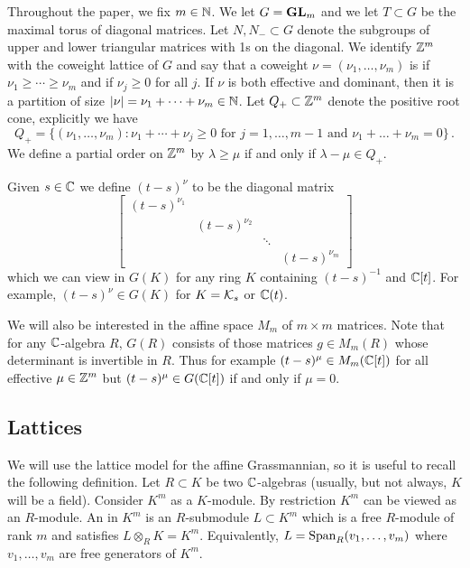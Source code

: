 \documentclass{article}
\begin{document}
Throughout the paper, we fix \( m \in \mathbb N\).  We let \(G = {\mathbf{GL}}_m\) and we let \(T\subset G\) be the maximal torus of diagonal matrices. Let \( N, N_- \subset G\) denote the subgroups of upper and lower triangular matrices with 1s on the diagonal. 
We identify \(\mathbb Z^m\) with the coweight lattice of \(G\) and say that a coweight \(\nu = (\nu_1,\dots,\nu_m)\) is  if \(\nu_1\ge\cdots\ge\nu_m\) and  if \(\nu_j\ge 0\) for all \(j\).
% 
If \(\nu\) is both effective and dominant, then it is a partition of size \(|\nu| = \nu_1 + \cdots + \nu_m\in\mathbb N\).  Let \( Q_+ \subset \mathbb Z^m\) denote the positive root cone, explicitly we have
\[
    Q_+ = \{ (\nu_1, \dots, \nu_m) : \nu_1 + \cdots + \nu_j \ge 0 \text{ for }j = 1, \dots, m-1 \text{ and } \nu_1 + \dots + \nu_m = 0 \} \,. 
\]
We define a partial order on \( \mathbb Z^m\) by \( \lambda \ge \mu \) if and only if \( \lambda - \mu \in Q_+ \).

Given \(s\in\mathbb C\) we define \((t-s)^\nu\) to be the diagonal matrix 
\[
\begin{bmatrix}
    (t-s)^{\nu_1} \\
    & (t-s)^{\nu_2} \\ 
    & & \ddots \\
    & & & (t-s)^{\nu_m}
\end{bmatrix} 
\]
which we can view in \(G(K)\) for any ring \( K \) containing \((t-s)^{-1}\) and \(\mathbb C[t]\). For example, \((t-s)^\nu\in G(K)\) for \( K = \mathcal K_s\) or \(\mathbb C(t)\).

We will also be interested in the affine space \( M_m\) of \(m\times m\) matrices.  Note that for any \( \mathbb C\)-algebra \( R \), \(G(R)\) consists of those matrices \( g \in M_m(R) \) whose determinant is invertible in \( R\). Thus for example \( (t-s)^\mu\in M_m(\mathbb C[t])\) for all effective \( \mu \in \mathbb Z^m\) but \((t-s)^\mu\in G(\mathbb C[t])\) if and only if \( \mu = 0 \).
% 

\subsection{Lattices}\label{ss:lat}
% 
We will use the lattice model for the affine Grassmannian, so it is useful to recall the following definition. Let \( R \subset K\) be two \(\mathbb C\)-algebras (usually, but not always, \(K\) will be a field). 
Consider \( K^m \) as a \(K\)-module. By restriction \( K^m\) can be viewed as an \(R\)-module.  An  in \(K^m\) is an \(R\)-submodule \( L \subset K^m\) which is a free \(R\)-module of rank \( m \) and satisfies \( L \otimes_R K = K^m \). Equivalently, \( L = \operatorname{Span}_R(v_1, \dots, v_m)\) where \(v_1, \dots, v_m\) are free generators of \(K^m\). 
% 
\end{document}

